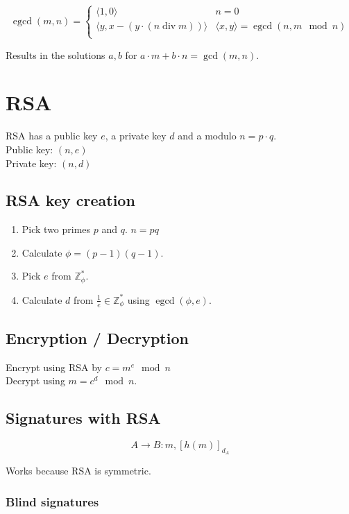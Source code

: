 \documentclass{article}
\newcommand{\Z}{\mathbb{Z}}
\newcommand{\egcd}{\operatorname{egcd}}
\begin{document}
\[
  \egcd(m,n) = \begin{cases}
    \langle 1,0 \rangle & n = 0 \\
    \langle y, x - (y \cdot (n \operatorname{div} m))\rangle & \langle x, y \rangle = \egcd(n, m \mod n) \\
  \end{cases}
\]

Results in the solutions $a,b$ for $a \cdot m + b \cdot n = \gcd(m,n)$.

\section{RSA}

RSA has a public key $e$, a private key $d$ and a modulo $n=p\cdot q$. \\
Public key: $(n, e)$\\
Private key: $(n,d)$ \\

\subsection{RSA key creation}
\begin{enumerate}
  \item Pick two primes $p$ and $q$. $n=pq$
  \item Calculate $\phi = (p-1)(q-1)$.
  \item Pick $e$ from $\Z^*_\phi$.
  \item Calculate $d$ from $\frac{1}{e} \in \Z^*_\phi$ using $\egcd(\phi,e)$.
\end{enumerate}

\subsection{Encryption / Decryption}
Encrypt using RSA by $c = m^e \mod n$\\
Decrypt using $m = c^d \mod n$.

\subsection{Signatures with RSA}

\[
  A \longrightarrow B : m, [h(m)]_{d_A}
\]

Works because RSA is symmetric.

\subsubsection{Blind signatures}
\end{document}
